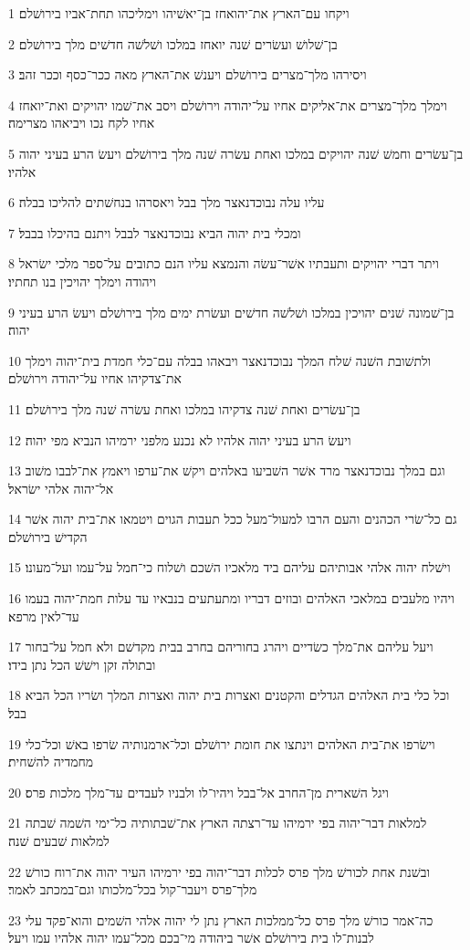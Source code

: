 \par 1 ויקחו עם־הארץ את־יהואחז בן־יאשׁיהו וימליכהו תחת־אביו בירושׁלם׃
\par 2 בן־שׁלושׁ ועשׂרים שׁנה יואחז במלכו ושׁלשׁה חדשׁים מלך בירושׁלם׃
\par 3 ויסירהו מלך־מצרים בירושׁלם ויענשׁ את־הארץ מאה ככר־כסף וככר זהב׃
\par 4 וימלך מלך־מצרים את־אליקים אחיו על־יהודה וירושׁלם ויסב את־שׁמו יהויקים ואת־יואחז אחיו לקח נכו ויביאהו מצרימה׃
\par 5 בן־עשׂרים וחמשׁ שׁנה יהויקים במלכו ואחת עשׂרה שׁנה מלך בירושׁלם ויעשׂ הרע בעיני יהוה אלהיו׃
\par 6 עליו עלה נבוכדנאצר מלך בבל ויאסרהו בנחשׁתים להליכו בבלה׃
\par 7 ומכלי בית יהוה הביא נבוכדנאצר לבבל ויתנם בהיכלו בבבל׃
\par 8 ויתר דברי יהויקים ותעבתיו אשׁר־עשׂה והנמצא עליו הנם כתובים על־ספר מלכי ישׂראל ויהודה וימלך יהויכין בנו תחתיו׃
\par 9 בן־שׁמונה שׁנים יהויכין במלכו ושׁלשׁה חדשׁים ועשׂרת ימים מלך בירושׁלם ויעשׂ הרע בעיני יהוה׃
\par 10 ולתשׁובת השׁנה שׁלח המלך נבוכדנאצר ויבאהו בבלה עם־כלי חמדת בית־יהוה וימלך את־צדקיהו אחיו על־יהודה וירושׁלם׃
\par 11 בן־עשׂרים ואחת שׁנה צדקיהו במלכו ואחת עשׂרה שׁנה מלך בירושׁלם׃
\par 12 ויעשׂ הרע בעיני יהוה אלהיו לא נכנע מלפני ירמיהו הנביא מפי יהוה׃
\par 13 וגם במלך נבוכדנאצר מרד אשׁר השׁביעו באלהים ויקשׁ את־ערפו ויאמץ את־לבבו משׁוב אל־יהוה אלהי ישׂראל׃
\par 14 גם כל־שׂרי הכהנים והעם הרבו למעול־מעל ככל תעבות הגוים ויטמאו את־בית יהוה אשׁר הקדישׁ בירושׁלם׃
\par 15 וישׁלח יהוה אלהי אבותיהם עליהם ביד מלאכיו השׁכם ושׁלוח כי־חמל על־עמו ועל־מעונו׃
\par 16 ויהיו מלעבים במלאכי האלהים ובוזים דבריו ומתעתעים בנבאיו עד עלות חמת־יהוה בעמו עד־לאין מרפא׃
\par 17 ויעל עליהם את־מלך כשׂדיים ויהרג בחוריהם בחרב בבית מקדשׁם ולא חמל על־בחור ובתולה זקן וישׁשׁ הכל נתן בידו׃
\par 18 וכל כלי בית האלהים הגדלים והקטנים ואצרות בית יהוה ואצרות המלך ושׂריו הכל הביא בבל׃
\par 19 וישׂרפו את־בית האלהים וינתצו את חומת ירושׁלם וכל־ארמנותיה שׂרפו באשׁ וכל־כלי מחמדיה להשׁחית׃
\par 20 ויגל השׁארית מן־החרב אל־בבל ויהיו־לו ולבניו לעבדים עד־מלך מלכות פרס׃
\par 21 למלאות דבר־יהוה בפי ירמיהו עד־רצתה הארץ את־שׁבתותיה כל־ימי השׁמה שׁבתה למלאות שׁבעים שׁנה׃
\par 22 ובשׁנת אחת לכורשׁ מלך פרס לכלות דבר־יהוה בפי ירמיהו העיר יהוה את־רוח כורשׁ מלך־פרס ויעבר־קול בכל־מלכותו וגם־במכתב לאמר׃
\par 23 כה־אמר כורשׁ מלך פרס כל־ממלכות הארץ נתן לי יהוה אלהי השׁמים והוא־פקד עלי לבנות־לו בית בירושׁלם אשׁר ביהודה מי־בכם מכל־עמו יהוה אלהיו עמו ויעל׃


